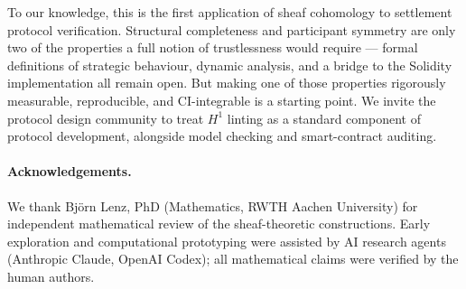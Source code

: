 \documentclass[11pt]{article}
\theoremstyle{plain}
\theoremstyle{definition}
\newcommand{\Hone}{H^{1}}
\begin{document}
To our knowledge, this is the first application of sheaf cohomology to
settlement protocol verification.  Structural completeness and participant
symmetry are only two of the properties a full notion of trustlessness would
require --- formal definitions of strategic behaviour, dynamic analysis, and
a bridge to the Solidity implementation all remain open.  But making one of
those properties rigorously measurable, reproducible, and CI-integrable is a
starting point.  We invite the protocol design community to treat $\Hone$
linting as a standard component of protocol development, alongside model
checking and smart-contract auditing.

\paragraph{Acknowledgements.}
We thank Bj\"{o}rn Lenz, PhD (Mathematics, RWTH Aachen University) for
independent mathematical review of the sheaf-theoretic constructions.  Early exploration and computational prototyping
were assisted by AI research agents (Anthropic Claude, OpenAI Codex);
all mathematical claims were verified by the human authors.



\end{document}
